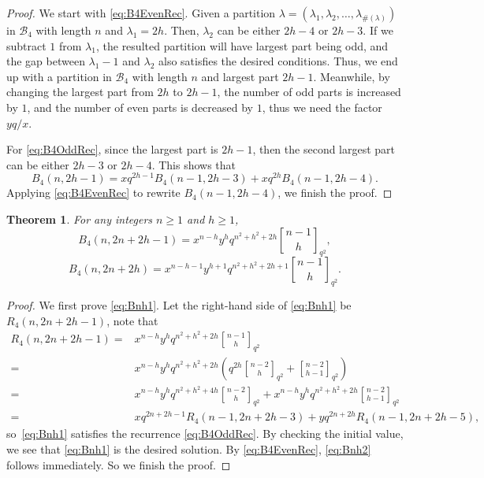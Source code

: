 \documentclass[12pt]{amsart}
\newtheorem{theorem}{Theorem}[section]
\theoremstyle{definition}
\theoremstyle{remark}
\numberwithin{equation}{section}
\begin{document}
\begin{proof}
We start with \eqref{eq:B4EvenRec}. Given a partition $\lambda=(\lambda_1,\lambda_2,\ldots,\lambda_{\#(\lambda)})$ in $\mathcal{B}_4$ with length $n$ and $\lambda_1=2h$. Then, $\lambda_2$ can be either $2h-4$ or $2h-3$. If we subtract $1$ from $\lambda_1$, the resulted partition will have largest part being odd, and the gap between $\lambda_1-1$ and $\lambda_2$ also satisfies the desired conditions. Thus, we end up with a partition in $\mathcal{B}_4$ with length $n$ and largest part $2h-1$. Meanwhile, by changing the largest part from $2h$ to $2h-1$, the number of odd parts is increased by $1$, and the number of even parts is decreased by $1$, thus we need the factor $yq/x$.

For \eqref{eq:B4OddRec}, since the largest part is $2h-1$, then the second largest part can be either $2h-3$ or $2h-4$. This shows that
$$B_4(n,2h-1)=xq^{2h-1}B_4(n-1,2h-3)+xq^{2h}B_4(n-1,2h-4).$$
Applying \eqref{eq:B4EvenRec} to rewrite $B_4(n-1,2h-4)$, we finish the proof.
\end{proof}

\begin{theorem}
For any integers $n\geq1$ and $h\geq1$,
\begin{equation}\label{eq:Bnh1}
B_{4}(n,2n+2h-1)=x^{n-h}y^{h}q^{n^2+h^2+2h}{n-1\brack h}_{q^2},
\end{equation}
\begin{equation}\label{eq:Bnh2}
B_{4}(n,2n+2h)=x^{n-h-1}y^{h+1}q^{n^2+h^2+2h+1}{n-1\brack h}_{q^2}.
\end{equation}
\end{theorem}

\begin{proof}
We first prove \eqref{eq:Bnh1}. Let the right-hand side of \eqref{eq:Bnh1} be $R_{4}(n,2n+2h-1)$, note that
\begin{align*}
R_4(n,2n+2h-1)=&x^{n-h}y^{h}q^{n^2+h^2+2h}{n-1\brack h}_{q^2}\\
=&x^{n-h}y^{h}q^{n^2+h^2+2h}\left(q^{2h}{n-2\brack h}_{q^2}+{n-2\brack h-1}_{q^2}\right)\\
=&x^{n-h}y^{h}q^{n^2+h^2+4h}{n-2\brack h}_{q^2}+x^{n-h}y^{h}q^{n^2+h^2+2h}{n-2\brack h-1}_{q^2}\\
=&xq^{2n+2h-1}R_4(n-1,2n+2h-3)+yq^{2n+2h}R_4(n-1,2n+2h-5),
\end{align*}
so~\eqref{eq:Bnh1} satisfies the recurrence \eqref{eq:B4OddRec}. By checking the initial value, we see that \eqref{eq:Bnh1} is the desired solution. By \eqref{eq:B4EvenRec}, \eqref{eq:Bnh2} follows immediately. So we finish the proof.
\end{proof}
\end{document}
